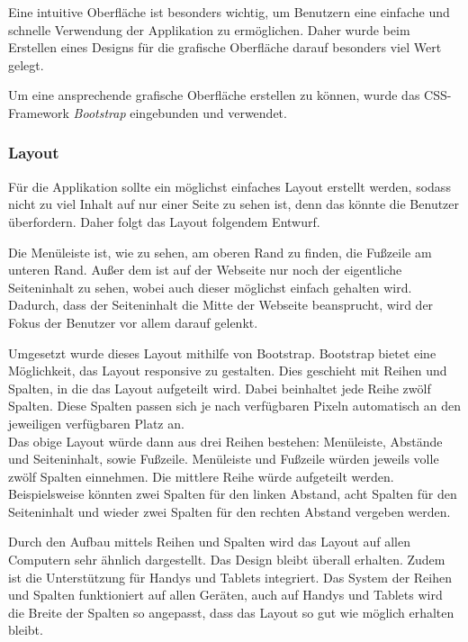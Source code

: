 
Eine intuitive Oberfläche ist besonders wichtig, um Benutzern eine einfache und schnelle Verwendung der Applikation zu ermöglichen. Daher wurde beim Erstellen eines Designs für die grafische Oberfläche darauf besonders viel Wert gelegt.

Um eine ansprechende grafische Oberfläche erstellen zu können, wurde das CSS-Framework \textit{Bootstrap} eingebunden und verwendet.

\subsubsection{Layout}
Für die Applikation sollte ein möglichst einfaches Layout erstellt werden, sodass nicht zu viel Inhalt auf nur einer Seite zu sehen ist, denn das könnte die Benutzer überfordern. Daher folgt das Layout folgendem Entwurf.


Die Menüleiste ist, wie zu sehen, am oberen Rand zu finden, die Fußzeile am unteren Rand. Außer dem ist auf der Webseite nur noch der eigentliche Seiteninhalt zu sehen, wobei auch dieser möglichst einfach gehalten wird. Dadurch, dass der Seiteninhalt die Mitte der Webseite beansprucht, wird der Fokus der Benutzer vor allem darauf gelenkt.

Umgesetzt wurde dieses Layout mithilfe von Bootstrap. Bootstrap bietet eine Möglichkeit, das Layout responsive zu gestalten. Dies geschieht mit Reihen und Spalten, in die das Layout aufgeteilt wird. Dabei beinhaltet jede Reihe zwölf Spalten. Diese Spalten passen sich je nach verfügbaren Pixeln automatisch an den jeweiligen verfügbaren Platz an.\\
Das obige Layout würde dann aus drei Reihen bestehen: Menüleiste, Abstände und Seiteninhalt, sowie Fußzeile. Menüleiste und Fußzeile würden jeweils volle zwölf Spalten einnehmen. Die mittlere Reihe würde aufgeteilt werden. Beispielsweise könnten zwei Spalten für den linken Abstand, acht Spalten für den Seiteninhalt und wieder zwei Spalten für den rechten Abstand vergeben werden.

Durch den Aufbau mittels Reihen und Spalten wird das Layout auf allen Computern sehr ähnlich dargestellt. Das Design bleibt überall erhalten. Zudem ist die Unterstützung für Handys und Tablets integriert. Das System der Reihen und Spalten funktioniert auf allen Geräten, auch auf Handys und Tablets wird die Breite der Spalten so angepasst, dass das Layout so gut wie möglich erhalten bleibt.

